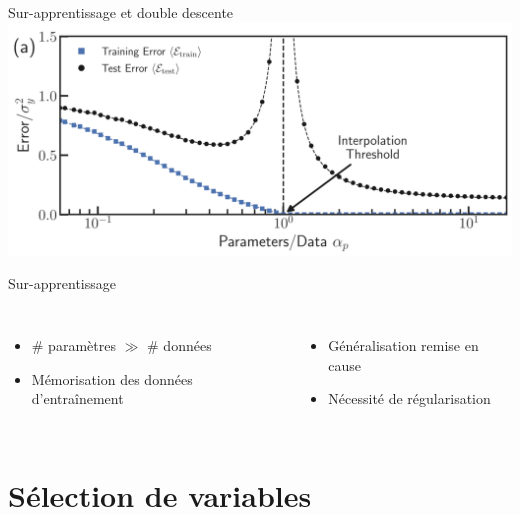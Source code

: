 \documentclass[presentation, aspectratio=169]{beamer}
\begin{document}
\begin{frame}{Sur-apprentissage et double descente}
  \centering
  \includegraphics[width=.7\textwidth]{double-descente}
  \begin{alertblock}{Sur-apprentissage}
    \begin{columns}
      \begin{itemize}
      \item \# paramètres $\gg$ \# données
      \item Mémorisation des données d'entraînement
      \end{itemize}
      \begin{itemize}
      \item Généralisation remise en cause
      \item Nécessité de régularisation
      \end{itemize}
    \end{columns}
  \end{alertblock}
\end{frame}


\section{Sélection de variables}
\end{document}
